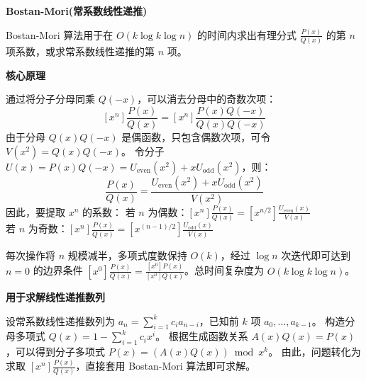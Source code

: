 \textbf{Bostan-Mori(常系数线性递推)}

Bostan-Mori 算法用于在 $O(k \log k \log n)$ 的时间内求出有理分式 $\frac{P(x)}{Q(x)}$ 的第 $n$ 项系数，或求常系数线性递推的第 $n$ 项。

\textbf{核心原理}

通过将分子分母同乘 $Q(-x)$，可以消去分母中的奇数次项：
\[
[x^n] \frac{P(x)}{Q(x)} = [x^n] \frac{P(x)Q(-x)}{Q(x)Q(-x)}
\]
由于分母 $Q(x)Q(-x)$ 是偶函数，只包含偶数次项，可令 $V(x^2) = Q(x)Q(-x)$。
令分子 $U(x) = P(x)Q(-x) = U_{\text{even}}(x^2) + x U_{\text{odd}}(x^2)$，则：
\[
\frac{P(x)}{Q(x)} = \frac{U_{\text{even}}(x^2) + x U_{\text{odd}}(x^2)}{V(x^2)}
\]
因此，要提取 $x^n$ 的系数：
若 $n$ 为偶数：$[x^n] \frac{P(x)}{Q(x)} = [x^{n/2}] \frac{U_{\text{even}}(x)}{V(x)}$\\
若 $n$ 为奇数：$[x^n] \frac{P(x)}{Q(x)} = [x^{(n-1)/2}] \frac{U_{\text{odd}}(x)}{V(x)}$

每次操作将 $n$ 规模减半，多项式度数保持 $O(k)$，经过 $\log n$ 次迭代即可达到 $n=0$ 的边界条件 $[x^0] \frac{P(x)}{Q(x)} = \frac{[x^0]P(x)}{[x^0]Q(x)}$。总时间复杂度为 $O(k \log k \log n)$。

\textbf{用于求解线性递推数列}

设常系数线性递推数列为 $a_n = \sum_{i=1}^k c_i a_{n-i}$，已知前 $k$ 项 $a_0, \dots, a_{k-1}$。
构造分母多项式 $Q(x) = 1 - \sum_{i=1}^k c_i x^i$。
根据生成函数关系 $A(x)Q(x) = P(x)$，可以得到分子多项式 $P(x) = (A(x) Q(x)) \bmod x^k$。
由此，问题转化为求取 $[x^n] \frac{P(x)}{Q(x)}$，直接套用 Bostan-Mori 算法即可求解。
